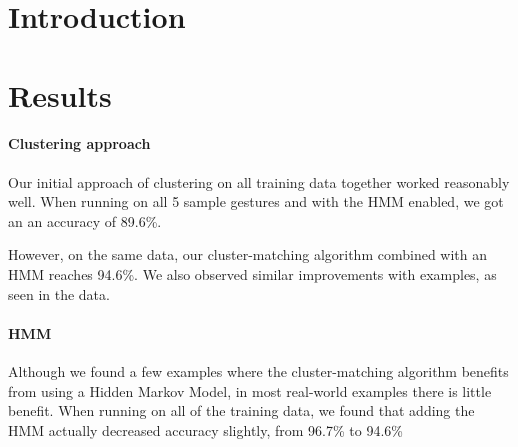\documentclass[12pt]{article}
\begin{document}
\maketitle


\section{Introduction}

\section{Results}\label{results}
\paragraph{Clustering approach}
Our initial approach of clustering on all training data together
worked reasonably well.  When running on all 5 sample gestures and
with the HMM enabled, we got an an accuracy of 89.6\%.

However, on the same data, our cluster-matching algorithm combined with
an HMM reaches 94.6\%.  We also observed similar improvements with examples,
as seen in the data.

\paragraph{HMM}
Although we found a few examples where the cluster-matching algorithm
benefits from using a Hidden Markov Model, in most real-world examples
there is little benefit.  When running on all of the training data,
we found that adding the HMM actually decreased accuracy slightly,
from 96.7\% to 94.6\%
\end{document}

